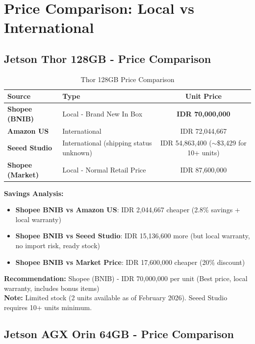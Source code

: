 \documentclass[12pt,a4paper]{article}
\begin{document}
\section{Price Comparison: Local vs International}

\subsection{Jetson Thor 128GB - Price Comparison}

\begin{table}[h!]
\centering
\small
\begin{tabularx}{\textwidth}{l X c}
\toprule
\textbf{Source} & \textbf{Type} & \textbf{Unit Price} \\
\midrule
\textbf{Shopee (BNIB)} & Local - Brand New In Box & \textbf{IDR 70,000,000} \\
\textbf{Amazon US} & International & IDR 72,044,667 \\
\textbf{Seeed Studio} & International (shipping status unknown) & IDR 54,863,400 ($\sim$\$3,429 for 10+ units) \\
\textbf{Shopee (Market)} & Local - Normal Retail Price & IDR 87,600,000 \\
\bottomrule
\end{tabularx}
\caption{Thor 128GB Price Comparison}
\end{table}

\textbf{Savings Analysis:}
\begin{itemize}
    \item \textbf{Shopee BNIB vs Amazon US}: IDR 2,044,667 cheaper (2.8\% savings + local warranty)
    \item \textbf{Shopee BNIB vs Seeed Studio}: IDR 15,136,600 more (but local warranty, no import risk, ready stock)
    \item \textbf{Shopee BNIB vs Market Price}: IDR 17,600,000 cheaper (20\% discount)
\end{itemize}

\textbf{Recommendation:} Shopee (BNIB) - IDR 70,000,000 per unit (Best price, local warranty, includes bonus items)\\
\textbf{Note:} Limited stock (2 units available as of February 2026). Seeed Studio requires 10+ units minimum.

\subsection{Jetson AGX Orin 64GB - Price Comparison}
\end{document}
